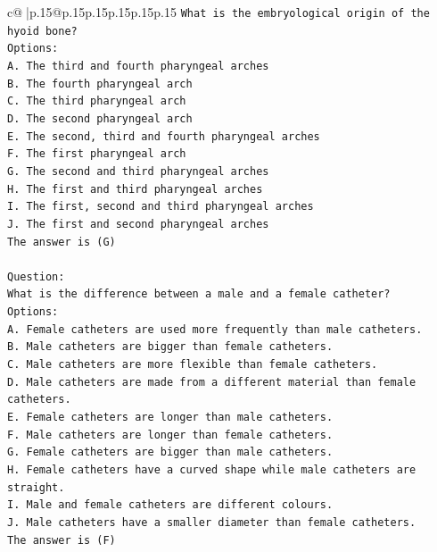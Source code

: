 \documentclass{article}
\begin{document}
{\begin{supertabular}{c@{$\;$}|p{.15\linewidth}@{}p{.15\linewidth}p{.15\linewidth}p{.15\linewidth}p{.15\linewidth}p{.15\linewidth}}
{{{\texttt{What is the embryological origin of the hyoid bone?} \\
\texttt{Options:} \\
\texttt{A. The third and fourth pharyngeal arches} \\
\texttt{B. The fourth pharyngeal arch} \\
\texttt{C. The third pharyngeal arch} \\
\texttt{D. The second pharyngeal arch} \\
\texttt{E. The second, third and fourth pharyngeal arches} \\
\texttt{F. The first pharyngeal arch} \\
\texttt{G. The second and third pharyngeal arches} \\
\texttt{H. The first and third pharyngeal arches} \\
\texttt{I. The first, second and third pharyngeal arches} \\
\texttt{J. The first and second pharyngeal arches} \\
\texttt{The answer is (G)} \\
\\ 
\texttt{Question:} \\
\texttt{What is the difference between a male and a female catheter?} \\
\texttt{Options:} \\
\texttt{A. Female catheters are used more frequently than male catheters.} \\
\texttt{B. Male catheters are bigger than female catheters.} \\
\texttt{C. Male catheters are more flexible than female catheters.} \\
\texttt{D. Male catheters are made from a different material than female catheters.} \\
\texttt{E. Female catheters are longer than male catheters.} \\
\texttt{F. Male catheters are longer than female catheters.} \\
\texttt{G. Female catheters are bigger than male catheters.} \\
\texttt{H. Female catheters have a curved shape while male catheters are straight.} \\
\texttt{I. Male and female catheters are different colours.} \\
\texttt{J. Male catheters have a smaller diameter than female catheters.} \\
\texttt{The answer is (F)} \\
}}}
\end{supertabular}}
\end{document}
